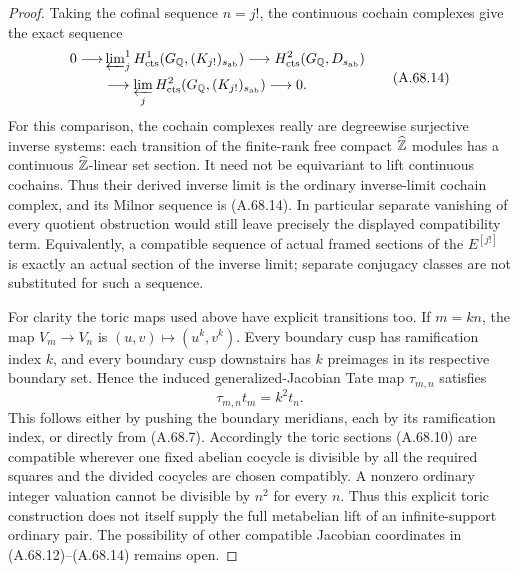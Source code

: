 \begin{proof}
Taking the cofinal sequence $n=j!$, the continuous cochain complexes
give the exact sequence
\[
 \begin{split}
 0\longrightarrow&
 \varprojlim\nolimits^{1}_{j}
 H^1_{\rm cts}(G_\mathbb Q,(K_{j!})_{s_{\rm ab}})
 \longrightarrow H^2_{\rm cts}(G_\mathbb Q,D_{s_{\rm ab}})\\
 &\longrightarrow
 \varprojlim_jH^2_{\rm cts}(G_\mathbb Q,(K_{j!})_{s_{\rm ab}})
 \longrightarrow0 .
 \end{split}
 \tag{A.68.14}
\]
For this comparison, the cochain complexes really are degreewise
surjective inverse systems: each transition of the finite-rank free
compact $\widehat{\mathbb Z}$ modules has a continuous
$\widehat{\mathbb Z}$-linear set section.
It need not be equivariant to lift continuous cochains.
Thus their derived inverse limit is the ordinary inverse-limit
cochain complex, and its Milnor sequence is (A.68.14).
In particular separate vanishing of every quotient obstruction
would still leave precisely the displayed compatibility term.
Equivalently, a compatible sequence of actual framed sections of
the $E^{[j!]}$ is exactly an actual section of the inverse limit;
separate conjugacy classes are not substituted for such a sequence.

For clarity the toric maps used above have explicit transitions too.
If $m=kn$, the map $V_m\to V_n$ is $(u,v)\mapsto(u^k,v^k)$.
Every boundary cusp has ramification index $k$, and every boundary
cusp downstairs has $k$ preimages in its respective boundary set.
Hence the induced generalized-Jacobian Tate map $\tau_{m,n}$ satisfies
\[
                         \tau_{m,n}t_m=k^2t_n.
 \tag{A.68.15}
\]
This follows either by pushing the boundary meridians, each by its
ramification index, or directly from (A.68.7).
Accordingly the toric sections (A.68.10) are compatible wherever
one fixed abelian cocycle is divisible by all the required squares
and the divided cocycles are chosen compatibly.
A nonzero ordinary integer valuation cannot be divisible by $n^2$
for every $n$.  Thus this explicit toric construction does not itself
supply the full metabelian lift of an infinite-support ordinary pair.
The possibility of other compatible Jacobian coordinates in
(A.68.12)--(A.68.14) remains open.
\end{proof}

